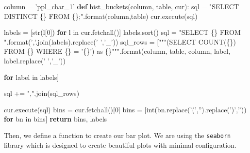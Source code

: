 \documentclass[]{report}
\newenvironment{Shaded}{}{}
\newcommand{\KeywordTok}[1]{\textcolor[rgb]{0.00,0.44,0.13}{\textbf{{#1}}}}
\newcommand{\DecValTok}[1]{\textcolor[rgb]{0.25,0.63,0.44}{{#1}}}
\newcommand{\StringTok}[1]{\textcolor[rgb]{0.25,0.44,0.63}{{#1}}}
\newcommand{\ControlFlowTok}[1]{\textcolor[rgb]{0.00,0.44,0.13}{\textbf{{#1}}}}
\newcommand{\OperatorTok}[1]{\textcolor[rgb]{0.40,0.40,0.40}{{#1}}}
\newcommand{\BuiltInTok}[1]{{#1}}
\newcommand{\NormalTok}[1]{{#1}}
\begin{document}
\begin{Shaded}
\begin{Highlighting}[]
\NormalTok{column }\OperatorTok{=} \StringTok{'ppl_char_1'}
\KeywordTok{def} \NormalTok{hist_buckets(column, table, cur):}
    \NormalTok{sql }\OperatorTok{=} \StringTok{"SELECT DISTINCT \{\} FROM \{\};"}\NormalTok{.}\BuiltInTok{format}\NormalTok{(column,table)}
    \NormalTok{cur.execute(sql)}

    \NormalTok{labels }\OperatorTok{=} \NormalTok{[}\BuiltInTok{str}\NormalTok{(l[}\DecValTok{0}\NormalTok{]) }\ControlFlowTok{for} \NormalTok{l }\OperatorTok{in} \NormalTok{cur.fetchall()]}
    \NormalTok{labels.sort()}
    \NormalTok{sql }\OperatorTok{=} \StringTok{"SELECT \{\} FROM "}\NormalTok{.}\BuiltInTok{format}\NormalTok{(}\StringTok{','}\NormalTok{.join(labels).replace(}\StringTok{' '}\NormalTok{,}\StringTok{'_'}\NormalTok{))}
    \NormalTok{sql_rows }\OperatorTok{=} \NormalTok{[}\StringTok{"""(SELECT COUNT(\{\}) }
\StringTok{                    FROM \{\} }
\StringTok{                    WHERE \{\} = '\{\}') as \{\}"""}\NormalTok{.}\BuiltInTok{format}\NormalTok{(column,}
                                                     \NormalTok{table,}
                                                     \NormalTok{column,}
                                                     \NormalTok{label,}
                                                     \NormalTok{label.replace(}\StringTok{' '}\NormalTok{,}\StringTok{'_'}\NormalTok{)) }
                                                     
                                                     \ControlFlowTok{for} \NormalTok{label }\OperatorTok{in} \NormalTok{labels]}

    \NormalTok{sql }\OperatorTok{+=} \StringTok{","}\NormalTok{.join(sql_rows)}
    
    \NormalTok{cur.execute(sql)}
    \NormalTok{bins }\OperatorTok{=} \NormalTok{cur.fetchall()[}\DecValTok{0}\NormalTok{]}
    \NormalTok{bins }\OperatorTok{=} \NormalTok{[}\BuiltInTok{int}\NormalTok{(bn.replace(}\StringTok{'('}\NormalTok{,}\StringTok{''}\NormalTok{).replace(}\StringTok{')'}\NormalTok{,}\StringTok{''}\NormalTok{)) }\ControlFlowTok{for} \NormalTok{bn }\OperatorTok{in} \NormalTok{bins]}
    \ControlFlowTok{return} \NormalTok{bins, labels}

\end{Highlighting}
\end{Shaded}

Then, we define a function to create our bar plot. We are using the
\texttt{seaborn} library which is designed to create beautiful plots
with minimal configuration.
\end{document}
